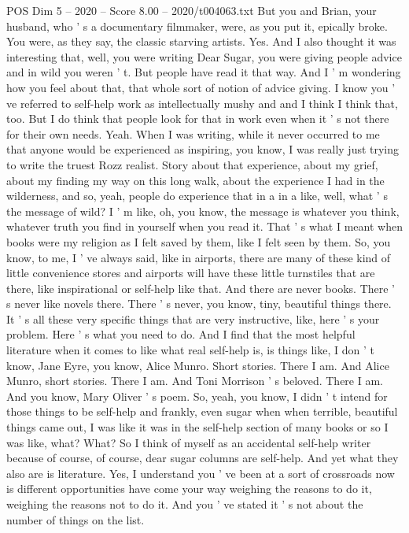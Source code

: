 \begin{textsample}{POS Dim 5 – 2020 – Score 8.00 – 2020/t004063.txt}
But you and Brian, your husband, who ' s a documentary filmmaker, were, as you put it, epically broke.
You were, as they say, the classic starving artists.
Yes.
And I also thought it was interesting that, well, you were writing Dear Sugar, you were giving people advice and in wild you weren ' t.
But people have read it that way.
And I ' m wondering how you feel about that, that whole sort of notion of advice giving.
I know you ' ve referred to self-help work as intellectually mushy and and I think I think that, too.
But I do think that people look for that in work even when it ' s not there for their own needs.
Yeah.
When I was writing, while it never occurred to me that anyone would be experienced as inspiring, you know, I was really just trying to write the truest Rozz realist.
Story about that experience, about my grief, about my finding my way on this long walk, about the experience I had in the wilderness, and so, yeah, people do experience that in a in a like, well, what ' s the message of wild?
I ' m like, oh, you know, the message is whatever you think, whatever truth you find in yourself when you read it.
That ' s what I meant when books were my religion as I felt saved by them, like I felt seen by them.
So, you know, to me, I ' ve always said, like in airports, there are many of these kind of little convenience stores and airports will have these little turnstiles that are there, like inspirational or self-help like that.
And there are never books.
There ' s never like novels there.
There ' s never, you know, tiny, beautiful things there.
It ' s all these very specific things that are very instructive, like, here ' s your problem.
Here ' s what you need to do.
And I find that the most helpful literature when it comes to like what real self-help is, is things like, I don ' t know, Jane Eyre, you know, Alice Munro.
Short stories.
There I am.
And Alice Munro, short stories.
There I am.
And Toni Morrison ' s beloved.
There I am.
And you know, Mary Oliver ' s poem.
So, yeah, you know, I didn ' t intend for those things to be self-help and frankly, even sugar when when terrible, beautiful things came out, I was like it was in the self-help section of many books or so I was like, what?
What?
So I think of myself as an accidental self-help writer because of course, of course, dear sugar columns are self-help.
And yet what they also are is literature.
Yes, I understand you ' ve been at a sort of crossroads now is different opportunities have come your way weighing the reasons to do it, weighing the reasons not to do it.
And you ' ve stated it ' s not about the number of things on the list.

\end{textsample}
